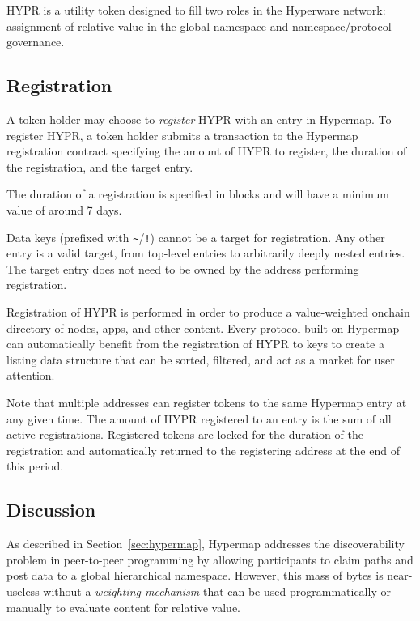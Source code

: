 \documentclass[runningheads]{llncs}
\begin{document}
HYPR is a utility token designed to fill two roles in the Hyperware network: assignment of relative value in the global namespace and namespace/protocol governance.

\subsection{Registration}
\label{sec:hyprregister}

A token holder may choose to \textit{register} HYPR with an entry in Hypermap.
To register HYPR, a token holder submits a transaction to the Hypermap registration contract specifying the amount of HYPR to register, the duration of the registration, and the target entry.

The duration of a registration is specified in blocks and will have a minimum value of around 7 days.

Data keys (prefixed with \verb|~|/\verb|!|) cannot be a target for registration.
Any other entry is a valid target, from top-level entries to arbitrarily deeply nested entries.
The target entry does not need to be owned by the address performing registration.

Registration of HYPR is performed in order to produce a value-weighted onchain directory of nodes, apps, and other content.
Every protocol built on Hypermap can automatically benefit from the registration of HYPR to keys to create a listing data structure that can be sorted, filtered, and act as a market for user attention.

Note that multiple addresses can register tokens to the same Hypermap entry at any given time.
The amount of HYPR registered to an entry is the sum of all active registrations.
Registered tokens are locked for the duration of the registration and automatically returned to the registering address at the end of this period.

\subsection{Discussion}
\label{sec:hyprdiscussion}

As described in Section~\ref{sec:hypermap}, Hypermap addresses the discoverability problem in peer-to-peer programming by allowing participants to claim paths and post data to a global hierarchical namespace.
However, this mass of bytes is near-useless without a \textit{weighting mechanism} that can be used programmatically or manually to evaluate content for relative value.
\end{document}
